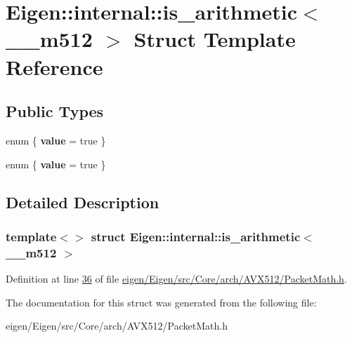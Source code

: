 \hypertarget{struct_eigen_1_1internal_1_1is__arithmetic_3_01____m512_01_4}{}\section{Eigen\+:\+:internal\+:\+:is\+\_\+arithmetic$<$ \+\_\+\+\_\+m512 $>$ Struct Template Reference}
\label{struct_eigen_1_1internal_1_1is__arithmetic_3_01____m512_01_4}
\subsection*{Public Types}
\begin{DoxyCompactItemize}
\item 
\mbox{\label{struct_eigen_1_1internal_1_1is__arithmetic_3_01____m512_01_4_ad6baa773d5ebdcbed428e04d24c31efc}} 
enum \{ {\bfseries value} = true
 \}
\item 
\mbox{\label{struct_eigen_1_1internal_1_1is__arithmetic_3_01____m512_01_4_a1872454a31e2b8da6abe570a159bfb66}} 
enum \{ {\bfseries value} = true
 \}
\end{DoxyCompactItemize}


\subsection{Detailed Description}
\subsubsection*{template$<$$>$\newline
struct Eigen\+::internal\+::is\+\_\+arithmetic$<$ \+\_\+\+\_\+m512 $>$}



Definition at line \hyperlink{eigen_2_eigen_2src_2_core_2arch_2_a_v_x512_2_packet_math_8h_source_l00036}{36} of file \hyperlink{eigen_2_eigen_2src_2_core_2arch_2_a_v_x512_2_packet_math_8h_source}{eigen/\+Eigen/src/\+Core/arch/\+A\+V\+X512/\+Packet\+Math.\+h}.



The documentation for this struct was generated from the following file\+:\begin{DoxyCompactItemize}
\item 
eigen/\+Eigen/src/\+Core/arch/\+A\+V\+X512/\+Packet\+Math.\+h\end{DoxyCompactItemize}
